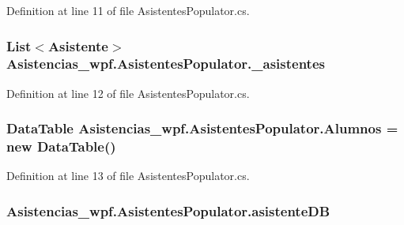 Definition at line 11 of file Asistentes\-Populator.\-cs.

\hypertarget{class_asistencias__wpf_1_1_asistentes_populator_a84a4c12da1ef4556f1cfefbea12902b8}{
\subsubsection[{\-\_\-asistentes}]{\setlength{\rightskip}{0pt plus 5cm}List$<${\bf Asistente}$>$ Asistencias\-\_\-wpf.\-Asistentes\-Populator.\-\_\-asistentes\hspace{0.3cm}{\ttfamily [private]}}}\label{class_asistencias__wpf_1_1_asistentes_populator_a84a4c12da1ef4556f1cfefbea12902b8}


Definition at line 12 of file Asistentes\-Populator.\-cs.

\hypertarget{class_asistencias__wpf_1_1_asistentes_populator_a5be02a2b0beb32f0c8b2aef488303359}{
\subsubsection[{Alumnos}]{\setlength{\rightskip}{0pt plus 5cm}Data\-Table Asistencias\-\_\-wpf.\-Asistentes\-Populator.\-Alumnos = new Data\-Table()\hspace{0.3cm}{\ttfamily [private]}}}\label{class_asistencias__wpf_1_1_asistentes_populator_a5be02a2b0beb32f0c8b2aef488303359}


Definition at line 13 of file Asistentes\-Populator.\-cs.

\hypertarget{class_asistencias__wpf_1_1_asistentes_populator_ab64596c710fa43f2a8391a4a3f662031}{
\subsubsection[{asistente\-D\-B}]{ Asistencias\-\_\-wpf.\-Asistentes\-Populator.\-asistente\-D\-B\hspace{0.3cm}{\ttfamily [private]}}}\label{class_asistencias__wpf_1_1_asistentes_populator_ab64596c710fa43f2a8391a4a3f662031}


